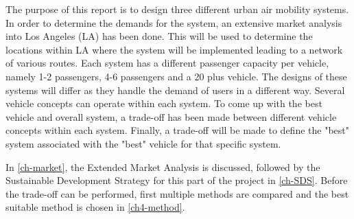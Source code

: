 The purpose of this report is to design three different urban air mobility systems. In order to determine the demands for the system, an extensive market analysis into Los Angeles (LA) has been done. This will be used to determine the locations within LA where the system will be implemented leading to a network of various routes. Each system has a different passenger capacity per vehicle, namely 1-2 passengers, 4-6 passengers and a 20 plus vehicle. The designs of these systems will differ as they handle the demand of users in a different way. Several vehicle concepts can operate within each system. To come up with the best vehicle and overall system, a trade-off has been made between different vehicle concepts within each system. Finally, a trade-off will be made to define the "best" system associated with the "best" vehicle for that specific system. 

In \autoref{ch-market}, the Extended Market Analysis is discussed, followed by the Sustainable Development Strategy for this part of the project in \autoref{ch-SDS}. Before the trade-off can be performed, first multiple methods are compared and the best suitable method is chosen in \autoref{ch4-method}. 